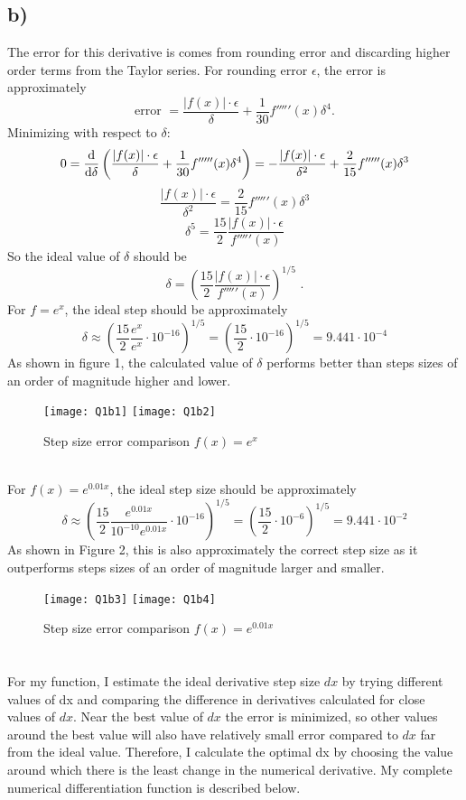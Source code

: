 \documentclass{article}
\newcommand{\<}[1]{\left\langle #1 \right\rangle }
\begin{document}
\subsection{b)}
The error for this derivative is comes from rounding error and discarding higher order terms from the Taylor series. For rounding error $\epsilon$, the error is approximately 
\[\text{error } = \frac{|f(x)|\cdot\epsilon}{\delta} + \frac{1}{30}f'''''(x)\delta^4 \text{.}\]
Minimizing with respect to $\delta$:
\[0 = \dv{}{\delta}\left( \frac{|f(x)|\cdot\epsilon}{\delta} + \frac{1}{30}f'''''(x)\delta^4 \right) = -\frac{|f(x)|\cdot \epsilon}{\delta^2} + \frac{2}{15}f'''''(x)\delta^3\]
\[\frac{|f(x)|\cdot \epsilon}{\delta^2} = \frac{2}{15}f'''''(x)\delta^3\]
\[\delta^5 = \frac{15}{2}\frac{|f(x)|\cdot \epsilon}{f'''''(x)}\]
So the ideal value of $\delta$ should be 
\[\boxed{ \delta = \left(\frac{15}{2}\frac{|f(x)|\cdot \epsilon}{f'''''(x)}\right)^{1/5} }\text{ .}\]
For $f = e^{x}$, the ideal step should be approximately
\[\delta \approx \left(\frac{15}{2}\frac{e^x}{e^x}\cdot10^{-16}\right)^{1/5} = \left(\frac{15}{2}\cdot10^{-16}\right)^{1/5} =  9.441\cdot10^{-4} \]
As shown in figure 1, the calculated value of $\delta$ performs better than steps sizes of an order of magnitude higher and lower.
\begin{figure}[h]
	\caption{Step size error comparison $f(x) = e^x$}
	\centering
	\texttt{[image: Q1b1]}
	\texttt{[image: Q1b2]}
\end{figure}
\\
For $f(x) = e^{0.01x}$, the ideal step size should be approximately
\[\delta \approx \left(\frac{15}{2}\frac{e^{0.01x}}{10^{-10}e^{0.01x}}\cdot 10^{-16} \right)^{1/5} = \left(\frac{15}{2} \cdot 10^{-6} \right)^{1/5} = 9.441\cdot 10^{-2} \]
As shown in Figure 2, this is also approximately the correct step size as it outperforms steps sizes of an order of magnitude larger and smaller.
\begin{figure}[h]
	\caption{Step size error comparison $f(x) = e^{0.01x}$}
	\centering
	\texttt{[image: Q1b3]}
	\texttt{[image: Q1b4]}
\end{figure}

\newpage
\section{}
For my function, I estimate the ideal derivative step size $dx$ by trying different values of dx and comparing the difference in derivatives calculated for close values of $dx$. Near the best value of $dx$ the error is minimized, so other values around the best value will also have relatively small error compared to $dx$ far from the ideal value. Therefore, I calculate the optimal dx by choosing the value around which there is the least change in the numerical derivative. My complete numerical differentiation function is described below.\\
\\
\end{document}
